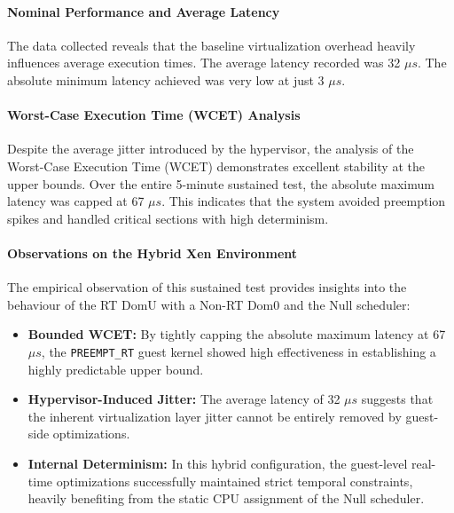 \paragraph{Nominal Performance and Average
Latency}\label{nominal-performance-and-average-latency-16}

The data collected reveals that the baseline virtualization overhead
heavily influences average execution times. The average latency recorded
was 32 $\mu s$. The absolute minimum latency achieved was very low at just 3
$\mu s$.

\paragraph{Worst-Case Execution Time (WCET)
Analysis}\label{worst-case-execution-time-wcet-analysis-18}

Despite the average jitter introduced by the hypervisor, the analysis of
the Worst-Case Execution Time (WCET) demonstrates excellent stability at
the upper bounds. Over the entire 5-minute sustained test, the absolute
maximum latency was capped at 67 $\mu s$. This indicates that the system
avoided preemption spikes and handled critical sections with high
determinism.

\paragraph{Observations on the Hybrid Xen
Environment}\label{observations-on-the-hybrid-xen-environment-2}

The empirical observation of this sustained test provides insights into
the behaviour of the RT DomU with a Non-RT Dom0 and the Null scheduler:

\begin{itemize}
\item
  \textbf{Bounded WCET:} By tightly capping the absolute maximum latency
  at 67 $\mu s$, the \texttt{PREEMPT\_RT} guest kernel showed high
  effectiveness in establishing a highly predictable upper bound.
\item
  \textbf{Hypervisor-Induced Jitter:} The average latency of 32 $\mu s$
  suggests that the inherent virtualization layer jitter cannot be
  entirely removed by guest-side optimizations.
\item
  \textbf{Internal Determinism:} In this hybrid configuration, the
  guest-level real-time optimizations successfully maintained strict
  temporal constraints, heavily benefiting from the static CPU
  assignment of the Null scheduler.
\end{itemize}

